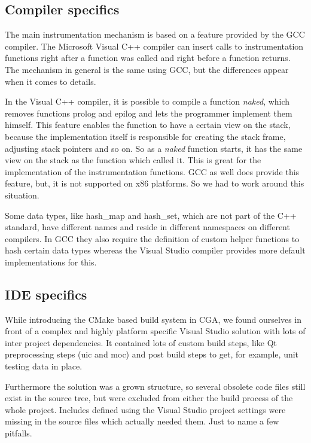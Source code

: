 \subsection{Compiler specifics}

The main instrumentation mechanism is based on a feature provided by the GCC compiler.  The Microsoft Visual C++ compiler can insert calls to instrumentation functions right after a function was called and right before a function returns. The mechanism in general is the same using GCC, but the differences appear when it comes to details.

In the Visual C++ compiler, it is possible to compile a function \emph{naked}, which removes functions prolog and epilog and lets the programmer implement them himself. This feature enables the function to have a certain view on the stack, because the implementation itself is responsible for creating the stack frame, adjusting stack pointers and so on. So as a \emph{naked} function starts, it has the same view on the stack as the function which called it. This is great for the implementation of the instrumentation functions. GCC as well does provide this feature, but, it is not supported on x86 platforms. So we had to work around this situation.

Some data types, like hash\_map and hash\_set, which are not part of the C++ standard, have different names and reside in different namespaces on different compilers.  In GCC they also require the definition of custom helper functions to hash certain data types whereas the Visual Studio compiler provides more default implementations for this.

\subsection{IDE specifics}

While introducing the CMake based build system in CGA, we found ourselves in front of a complex and highly platform specific Visual Studio solution with lots of inter project dependencies. It contained lots of custom build steps, like Qt preprocessing steps (uic and moc) and post build steps to get, for example, unit testing data in place.

Furthermore the solution was a grown structure, so several obsolete code files still exist in the source tree, but were excluded from either the build process of the whole project.  Includes defined using the Visual Studio project settings were missing in the source files which actually needed them. Just to name a few pitfalls.

